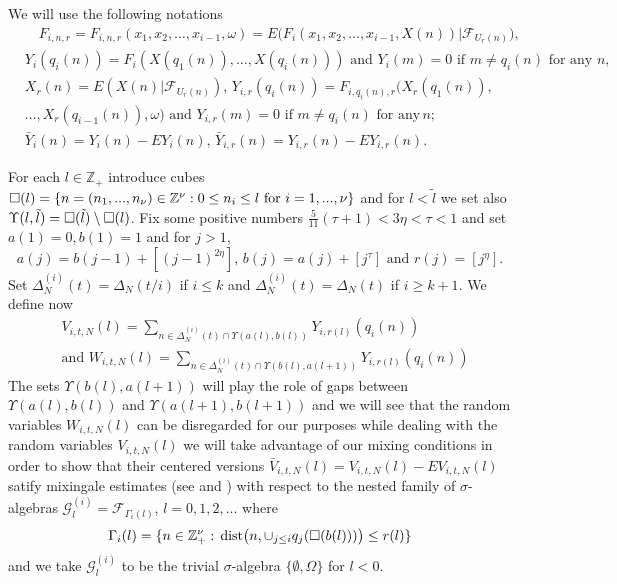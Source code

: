 We will use the following notations
\begin{eqnarray}\label{3.5}
&\quad F_{i,n,r}=F_{i,n,r}(x_1,x_2,\ldots, x_{i-1},\omega)
=E\big(F_i(x_1,x_2,\ldots, x_{i-1},X(n))|{{\mathcal F}}_{U_r(n)}\big),\\
&Y_i(q_i(n))=F_i(X(q_1(n)),\ldots, X(q_i(n)))\,\,\mbox{and}\,\,
Y_i(m)=0\,\,\mbox{if}\,\, m\ne q_i(n)\,\,\mbox{for any}\,\, n,\nonumber\\
&X_r(n)=E(X(n)|{{\mathcal F}}_{U_r(n)}),\, Y_{i,r}(q_i(n))=F_{i,q_i(n),r} (X_r(q_1(n)),
\nonumber\\
&\ldots, X_r(q_{i-1}(n)),\omega)\,\,
\mbox{and}\,\, Y_{i,r}(m)=0\,\,\mbox{if}\,\, m\ne q_i(n)\,\,\mbox{for any}\,
 n;\nonumber\\
&\bar Y_i(n)=Y_i(n)-EY_i(n),\,\bar Y_{i,r}(n)=Y_{i,r}(n)-EY_{i,r}(n).
\nonumber
\end{eqnarray}

For each $l\in{{\mathbb Z}}_+$ introduce cubes ${{\large\square}}(l)=\{ n=(n_1,...,n_\nu)\in{{\mathbb Z}}^\nu:
0\leq n_i\leq l\,\,\mbox{for}\,\, i=1,...,\nu\}$ and for $l<\tilde l$ we set 
also ${{\Upsilon}}(l,\tilde l)={{\large\square}}(\tilde l)\setminus{{\large\square}}(l)$. Fix some positive numbers
$\frac 5{11}(\tau+1)<3\eta<\tau<1$ and set $a(1)=0,b(1)=1$ and for 
$j>1$,
\begin{equation}\label{3.6}
a(j)=b(j-1)+[(j-1)^{2\eta}],\, b(j)=a(j)+[j^\tau]\,\,\mbox{and}\,\, r(j)=[j^\eta].
\end{equation}
Set ${{\Delta}}^{(i)}_N(t)={{\Delta}}_N(t/i)$ if $i\leq k$ and ${{\Delta}}_N^{(i)}(t)=
{{\Delta}}_N(t)$ if $i\geq k+1$. We define now 
\begin{eqnarray}\label{3.7}
&V_{i,t,N}(l)=\sum_{n\in{{\Delta}}^{(i)}_N(t)\cap{{\Upsilon}}(a(l),b(l))}Y_{i,r(l)}(q_i(n))\\
&\mbox{and}\,\,W_{i,t,N}(l)=\sum_{n\in{{\Delta}}^{(i)}_N(t)\cap{{\Upsilon}}(b(l),a(l+1))}
Y_{i,r(l)}(q_i(n))\nonumber
\end{eqnarray}
The sets ${{\Upsilon}}(b(l),a(l+1))$ will play the role of gaps between 
${{\Upsilon}}(a(l),b(l))$ and ${{\Upsilon}}(a(l+1),b(l+1))$ and we will see that the random 
variables $W_{i,t,N}(l)$ can be disregarded for our purposes while dealing 
with the random variables $V_{i,t,N}(l)$ we will take advantage of our mixing 
conditions in order to show that their centered versions $\bar V_{i,t,N}(l)=
V_{i,t,N}(l)-EV_{i,t,N}(l)$ satify mixingale estimates (see \cite{ML1} and
\cite{ML2}) with respect to the nested family of ${{\sigma}}$-algebras ${{\mathcal G}}^{(i)}_l=
{{\mathcal F}}_{{{\Gamma}}_i(l)},\, l=0,1,2,...$ where 
\[
{{\Gamma}}_i(l)=\{ n\in{{\mathbb Z}}^\nu_+:\,\mbox{dist}\big(n,\cup_{j\leq i}q_j({{\large\square}}(b(l)))
\big)\leq r(l)\}
\]
and we take ${{\mathcal G}}^{(i)}_l$ to be the trivial ${{\sigma}}$-algebra $\{\emptyset,{{\Omega}}\}$
for $l<0$.

